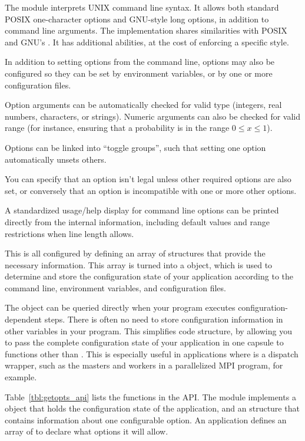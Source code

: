 
The  module interprets UNIX command line syntax. It
allows both standard POSIX one-character options and GNU-style long
options, in addition to command line arguments. The implementation
shares similarities with POSIX  and GNU's
. It has additional abilities, at the cost of
enforcing a specific style.

In addition to setting options from the command line, options may also
be configured so they can be set by environment variables, or by one
or more configuration files.

Option arguments can be automatically checked for valid type
(integers, real numbers, characters, or strings). Numeric arguments
can also be checked for valid range (for instance, ensuring that a
probability is in the range $0 \leq x \leq 1$).

Options can be linked into ``toggle groups'', such that setting one
option automatically unsets others. 

You can specify that an option isn't legal unless other required
options are also set, or conversely that an option is incompatible
with one or more other options.

A standardized usage/help display for command line options can be
printed directly from the internal information, including default
values and range restrictions when line length allows.

This is all configured by defining an array of 
structures that provide the necessary information. This array is
turned into a  object, which is used to determine
and store the configuration state of your application according to the
command line, environment variables, and configuration files.

The  object can be queried directly when your
program executes configuration-dependent steps. There is often no need
to store configuration information in other variables in your
program. This simplifies code structure, by allowing you to pass the
complete configuration state of your application in one capsule to
functions other than . This is especially useful in
applications where  is a dispatch wrapper, such as the
masters and workers in a parallelized MPI program, for example.

Table~\ref{tbl:getopts_api} lists the functions in the
 API. The module implements a 
object that holds the configuration state of the application, and an
 structure that contains information about one
configurable option. An application defines an array of
 to declare what options it will allow.

